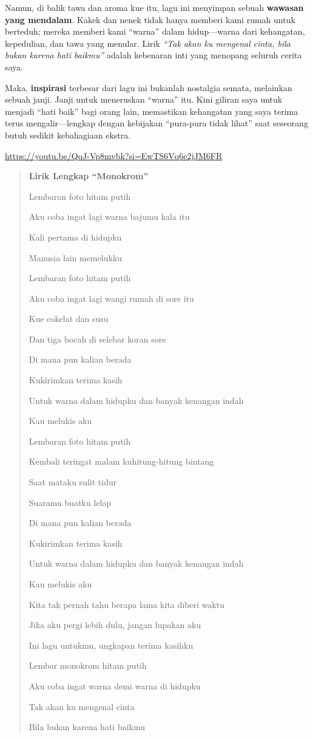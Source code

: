 \documentclass[
  letterpaper,
  DIV=11,
  numbers=noendperiod]{scrreprt}
\begin{document}
Namun, di balik tawa dan aroma kue itu, lagu ini menyimpan sebuah
\textbf{wawasan yang mendalam}. Kakek dan nenek tidak hanya memberi kami
rumah untuk berteduh; mereka memberi kami ``warna'' dalam hidup---warna
dari kehangatan, kepedulian, dan tawa yang menular. Lirik \emph{``Tak
akan ku mengenal cinta, bila bukan karena hati baikmu''} adalah
kebenaran inti yang menopang seluruh cerita saya.

Maka, \textbf{inspirasi} terbesar dari lagu ini bukanlah nostalgia
semata, melainkan sebuah janji. Janji untuk meneruskan ``warna'' itu.
Kini giliran saya untuk menjadi ``hati baik'' bagi orang lain,
memastikan kehangatan yang saya terima terus mengalir---lengkap dengan
kebijakan ``pura-pura tidak lihat'' saat seseorang butuh sedikit
kebahagiaan ekstra.

\url{https://youtu.be/QqJ-Vp8mvbk?si=EwTS6Vq6e2jJM6FR}

\begin{quote}
\textbf{Lirik Lengkap ``Monokrom''}

Lembaran foto hitam putih

Aku coba ingat lagi warna bajumu kala itu

Kali pertama di hidupku

Manusia lain memelukku

Lembaran foto hitam putih

Aku coba ingat lagi wangi rumah di sore itu

Kue cokelat dan susu

Dan tiga bocah di selebar koran sore

Di mana pun kalian berada

Kukirimkan terima kasih

Untuk warna dalam hidupku dan banyak kenangan indah

Kau melukis aku

Lembaran foto hitam putih

Kembali teringat malam kuhitung-hitung bintang

Saat mataku sulit tidur

Suaramu buatku lelap

Di mana pun kalian berada

Kukirimkan terima kasih

Untuk warna dalam hidupku dan banyak kenangan indah

Kau melukis aku

Kita tak pernah tahu berapa lama kita diberi waktu

Jika aku pergi lebih dulu, jangan lupakan aku

Ini lagu untukmu, ungkapan terima kasihku

Lembar monokrom hitam putih

Aku coba ingat warna demi warna di hidupku

Tak akan ku mengenal cinta

Bila bukan karena hati baikmu
\end{quote}
\end{document}
